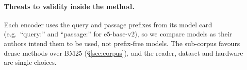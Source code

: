 \paragraph{Threats to validity inside the method.}
Each encoder uses the query and passage prefixes from its model card (e.g.\ ``query:'' and ``passage:'' for e5-base-v2), so we compare models as their authors intend them to be used, not prefix-free models.
The sub-corpus favours dense methods over BM25 (\S\ref{sec:corpus}), and the reader, dataset and hardware are single choices.
